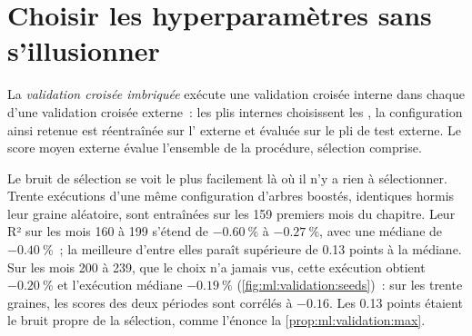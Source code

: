 \section{Choisir les hyperparamètres sans s'illusionner}

\begin{definition}\label{def:ml:validation:nested}
La \emph{validation croisée imbriquée} exécute une validation croisée interne dans chaque 
d'une validation croisée externe~: les plis internes choisissent les , la configuration ainsi retenue est réentraînée sur l' externe et évaluée sur le pli de test externe. Le score moyen externe évalue l'ensemble de la procédure, sélection comprise.
\end{definition}

Le bruit de sélection se voit le plus facilement là où il n'y a rien à sélectionner. Trente exécutions d'une même configuration d'arbres boostés,
identiques hormis leur graine aléatoire, sont entraînées sur les 159 premiers mois du chapitre. Leur R² sur les mois 160
à 199 s'étend de $-0.60~\%$ à $-0.27~\%$, avec une médiane de $-0.40~\%$~; la meilleure d'entre elles paraît supérieure de 0.13 points à
la médiane. Sur les mois 200 à 239, que le choix n'a jamais vus, cette exécution obtient $-0.20~\%$ et l'exécution médiane $-0.19~\%$
(\cref{fig:ml:validation:seeds})~: sur les trente graines, les scores des deux périodes sont corrélés à $-0.16$. Les 0.13 points
étaient le bruit propre de la sélection, comme l'énonce la \cref{prop:ml:validation:max}.

\begin{omfigure}

\label{fig:ml:validation:seeds}
\end{omfigure}

